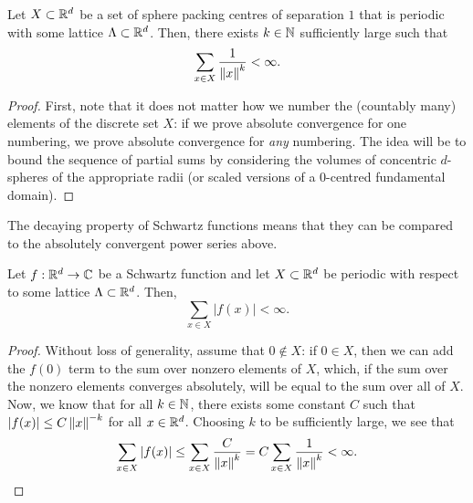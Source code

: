 \begin{lemma}
  Let $X \subset \mathbb{R}^d$ be a set of sphere packing centres of separation $1$ that is periodic with some lattice $\Lambda \subset \mathbb{R}^d$. Then, there exists $k \in \mathbb{N}$ sufficiently large such that
  \[
    \sum_{x \in X} \frac{1}{\left\lVert x \right\rVert^{k}} < \infty.
  \]
\end{lemma}
\begin{proof}
  First, note that it does not matter how we number the (countably many) elements of the discrete set $X$: if we prove absolute convergence for one numbering, we prove absolute convergence for \emph{any} numbering. The idea will be to bound the sequence of partial sums by considering the volumes of concentric $d$-spheres of the appropriate radii (or scaled versions of a $0$-centred fundamental domain).



\end{proof}

The decaying property of Schwartz functions means that they can be compared to the absolutely convergent power series above.

\begin{lemma}
  Let $f : \mathbb{R}^d \to \mathbb{C}$ be a Schwartz function and let $X \subset \mathbb{R}^d$ be periodic with respect to some lattice $\Lambda \subset \mathbb{R}^d$. Then,
  \[
    \sum_{x \in X} |f(x)| < \infty.
  \]
\end{lemma}
\begin{proof}
  Without loss of generality, assume that $0 \notin X$: if $0 \in X$, then we can add the $f(0)$ term to the sum over nonzero elements of $X$, which, if the sum over the nonzero elements converges absolutely, will be equal to the sum over all of $X$. Now, we know that for all $k \in \mathbb{N}$, there exists some constant $C$ such that $|f(x)| \leq C\left\lVert x \right\rVert^{-k}$ for all $x \in \mathbb{R}^d$. Choosing $k$ to be sufficiently large, we see that
  \[
    \sum_{x \in X} |f(x)| \leq \sum_{x \in X} \frac{C}{\left\lVert x \right\rVert^{k}} = C \sum_{x \in X} \frac{1}{\left\lVert x \right\rVert^k} < \infty.
  \]
\end{proof}

